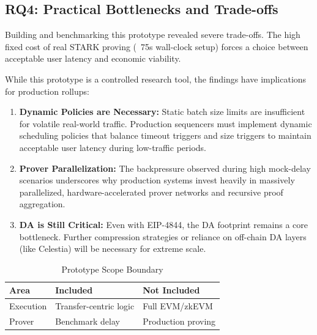 \subsection{RQ4: Practical Bottlenecks and Trade-offs}
\label{sec:prototype_vs_production_discussion}
Building and benchmarking this prototype revealed severe trade-offs. The high fixed cost of real STARK proving (~75s wall-clock setup) forces a choice between acceptable user latency and economic viability. 

While this prototype is a controlled research tool, the findings have implications for production rollups:
\begin{enumerate}
    \item \textbf{Dynamic Policies are Necessary:} Static batch size limits are insufficient for volatile real-world traffic. Production sequencers must implement dynamic scheduling policies that balance timeout triggers and size triggers to maintain acceptable user latency during low-traffic periods.
    \item \textbf{Prover Parallelization:} The backpressure observed during high mock-delay scenarios underscores why production systems invest heavily in massively parallelized, hardware-accelerated prover networks and recursive proof aggregation.
    \item \textbf{DA is Still Critical:} Even with EIP-4844, the DA footprint remains a core bottleneck. Further compression strategies or reliance on off-chain DA layers (like Celestia) will be necessary for extreme scale.
\end{enumerate}

\begin{table}[H]
\centering
\caption{Prototype Scope Boundary}
\label{tab:prototype_scope_boundary}
\begin{tabular}{|l|p{4cm}|p{4cm}|}
\hline
\textbf{Area} & \textbf{Included} & \textbf{Not Included} \\ \hline
Execution & Transfer-centric logic & Full EVM/zkEVM \\ \hline
Prover & Benchmark delay & Production proving \\ \hline
\end{tabular}
\end{table}


